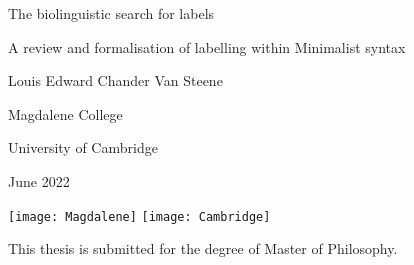 \begin{titlepage}
    \begin{center}
        \vspace*{3cm}
        {\Huge The biolinguistic search for labels}

        \vspace{5mm}
        {\LARGE A review and formalisation of labelling within Minimalist syntax}
        \vspace{5cm-1.5\baselineskip}

        {\Large Louis Edward Chander Van Steene}

        {\large Magdalene College}

        {\large University of Cambridge}
        \vspace{1cm}

        {\large {} June 2022}
        \vspace{2cm}

        \texttt{[image: Magdalene]}
        \hspace{1cm}
        \texttt{[image: Cambridge]}

        \vfill

        {\large This thesis is submitted for the degree of Master of
Philosophy.}

    \end{center}
\end{titlepage}
